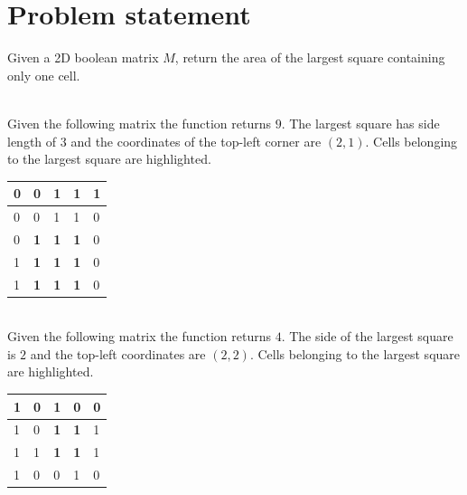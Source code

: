 \section{Problem statement}
\begin{exercise}
Given a 2D boolean matrix $M$, return the area of the largest square containing only one cell.
	\begin{example}
		\hfill \\
		Given the following matrix the function returns $9$. The largest square has side length of
		$3$ and the coordinates of the top-left corner are $(2,1)$. Cells belonging to the largest
		square are highlighted.

		\begin{tabular}{|l|l|l|l|l|}
		\hline
		0 & 0                                  & 1                                  & 1 & 1 \\
		\hline
		0 & 0                                  & 1                                  & 1 & 0 \\
		\hline
		0 & \cellcolor[HTML]{32CB00}\textbf{1} & \cellcolor[HTML]{32CB00}\textbf{1} &
		\cellcolor[HTML]{32CB00}\textbf{1} & 0 \\ \hline
		1 & \cellcolor[HTML]{32CB00}\textbf{1} & \cellcolor[HTML]{32CB00}\textbf{1} &
		\cellcolor[HTML]{32CB00}\textbf{1} & 0 \\ \hline
		1 & \cellcolor[HTML]{32CB00}\textbf{1} & \cellcolor[HTML]{32CB00}\textbf{1} &
		\cellcolor[HTML]{32CB00}\textbf{1} & 0 \\ \hline
		\end{tabular}
		
	\end{example}

	\begin{example}
		\hfill \\
		Given the following matrix the function returns $4$. The side of the largest square is $2$
		and the top-left coordinates are $(2,2)$. Cells belonging to the largest square are
		highlighted.
		
		\begin{tabular}{|l|l|l|l|l|}
		\hline
		1 & 0 & 1                                  & 0                                  & 0 \\
		\hline
		1 & 0 & \cellcolor[HTML]{32CB00}\textbf{1} & \cellcolor[HTML]{32CB00}\textbf{1} & 1 \\
		\hline
		1 & 1 & \cellcolor[HTML]{32CB00}\textbf{1} & \cellcolor[HTML]{32CB00}\textbf{1} & 1 \\
		\hline
		1 & 0 & 0                                  & 1                                  & 0 \\
		\hline
\end{tabular}

	\end{example}

\end{exercise}


